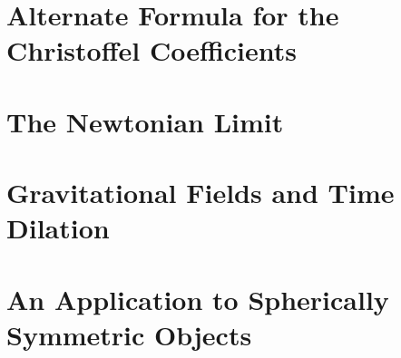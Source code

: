 \documentclass[12pt]{article}
\theoremstyle{definition}
\theoremstyle{remark}
\begin{document}
\section{Alternate Formula for the Christoffel Coefficients}

\section{The Newtonian Limit}

\section{Gravitational Fields and Time Dilation}

\section{An Application to Spherically Symmetric Objects}













































\end{document}
